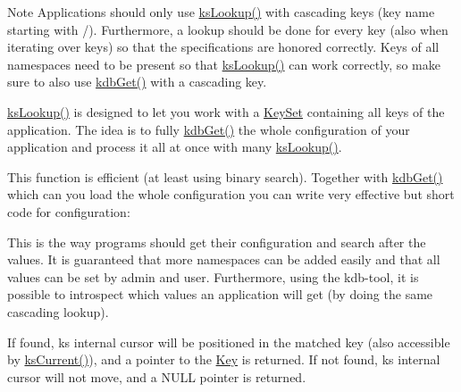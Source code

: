 \begin{DoxyNote}{Note}
Applications should only use \hyperlink{group__keyset_ga60f1ddcf23272f2b29b90e92ebe9b56f}{ks\+Lookup()} with cascading keys (key name starting with {\ttfamily /}). Furthermore, a lookup should be done for every key (also when iterating over keys) so that the specifications are honored correctly. Keys of all namespaces need to be present so that \hyperlink{group__keyset_ga60f1ddcf23272f2b29b90e92ebe9b56f}{ks\+Lookup()} can work correctly, so make sure to also use \hyperlink{group__kdb_ga28e385fd9cb7ccfe0b2f1ed2f62453a1}{kdb\+Get()} with a cascading key.
\end{DoxyNote}
{\ttfamily \hyperlink{group__keyset_ga60f1ddcf23272f2b29b90e92ebe9b56f}{ks\+Lookup()}} is designed to let you work with a \hyperlink{classkdb_1_1KeySet}{Key\+Set} containing all keys of the application. The idea is to fully \hyperlink{group__kdb_ga28e385fd9cb7ccfe0b2f1ed2f62453a1}{kdb\+Get()} the whole configuration of your application and process it all at once with many {\ttfamily \hyperlink{group__keyset_ga60f1ddcf23272f2b29b90e92ebe9b56f}{ks\+Lookup()}}.

This function is efficient (at least using binary search). Together with \hyperlink{group__kdb_ga28e385fd9cb7ccfe0b2f1ed2f62453a1}{kdb\+Get()} which can you load the whole configuration you can write very effective but short code for configuration\+:


 This is the way programs should get their configuration and search after the values. It is guaranteed that more namespaces can be added easily and that all values can be set by admin and user. Furthermore, using the kdb-\/tool, it is possible to introspect which values an application will get (by doing the same cascading lookup).

If found, {\ttfamily ks} internal cursor will be positioned in the matched key (also accessible by \hyperlink{group__keyset_ga4287b9416912c5f2ab9c195cb74fb094}{ks\+Current()}), and a pointer to the \hyperlink{classkdb_1_1Key}{Key} is returned. If not found, {\ttfamily ks} internal cursor will not move, and a N\+U\+LL pointer is returned.

